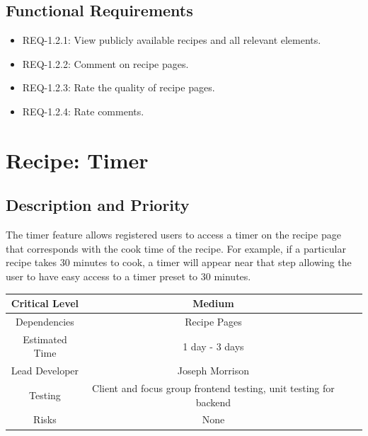 \documentclass{scrreprt}
\begin{document}
\subsection{\gls{Functional Requirements}}

\begin{itemize}
    \item REQ-1.2.1: View publicly available recipes and all relevant elements.
    \item REQ-1.2.2: Comment on recipe pages.
    \item REQ-1.2.3: Rate the quality of recipe pages.
    \item REQ-1.2.4: Rate comments.
\end{itemize}

\section{Recipe: Timer}

\subsection{Description and Priority}

The timer feature allows registered users to access a timer on the recipe page that corresponds with the cook time of the recipe. For example, if a particular recipe takes 30 minutes to cook, a timer will appear near that step allowing the user to have easy access to a timer preset to 30 minutes.

\begin{center}
    \begin{tabular}{| c | c | c | c |}
        \hline
        Critical Level & Medium                                                            \\
        \hline
        Dependencies   & Recipe Pages                                                      \\
        \hline
        Estimated Time & 1 day - 3 days                                                    \\
        \hline
        Lead Developer & Joseph Morrison                                                   \\
        \hline
        Testing         & Client and focus group \gls{frontend} testing,
                          \gls{unit testing} for \gls{backend}                             \\
        \hline
        Risks          & None                                                              \\
        \hline
    \end{tabular}
\end{center}
\end{document}
